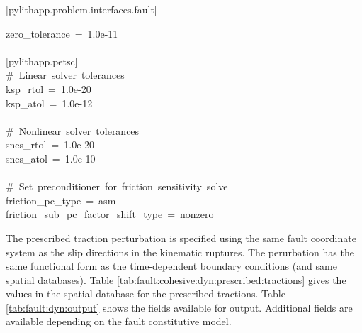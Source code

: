 \begin{lyxcode}
{[}pylithapp.problem.interfaces.fault{]}

zero\_tolerance~=~1.0e-11~\\
~\\
{[}pylithapp.petsc{]}~\\
\#~Linear~solver~tolerances~\\
ksp\_rtol~=~1.0e-20~\\
ksp\_atol~=~1.0e-12~\\
~\\
\#~Nonlinear~solver~tolerances~\\
snes\_rtol~=~1.0e-20~\\
snes\_atol~=~1.0e-10~\\
~\\
\#~Set~preconditioner~for~friction~sensitivity~solve~\\
friction\_pc\_type~=~asm~\\
friction\_sub\_pc\_factor\_shift\_type~=~nonzero
\end{lyxcode}
The prescribed traction perturbation is specified using the same fault
coordinate system as the slip directions in the kinematic ruptures.
The perurbation has the same functional form as the time-dependent
boundary conditions (and same spatial databases). Table \ref{tab:fault:cohesive:dyn:prescribed:tractions}
gives the values in the spatial database for the prescribed tractions.
Table \ref{tab:fault:dyn:output} shows the fields available for output.
Additional fields are available depending on the fault constitutive
model.

